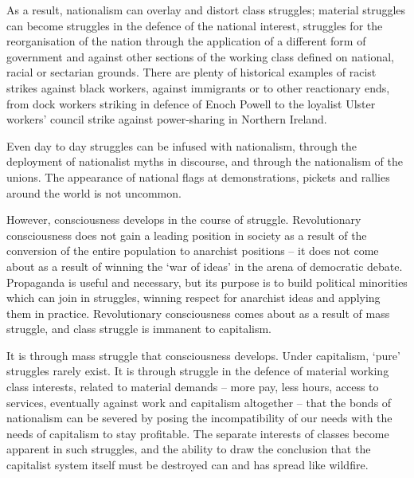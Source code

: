 As a result, nationalism can overlay and distort class struggles; material struggles can become struggles in the defence of the national interest, struggles for the reorganisation of the nation through the application of a different form of government and against other sections of the working class defined on national, racial or sectarian grounds.
There are plenty of historical examples of racist strikes against black workers, against immigrants or to other reactionary ends, from dock workers striking in defence of Enoch Powell to the loyalist Ulster workers’ council strike against power-sharing in Northern Ireland.

Even day to day struggles can be infused with nationalism, through the deployment of nationalist myths in discourse, and through the nationalism of the unions.
The appearance of national flags at demonstrations, pickets and rallies around the world is not uncommon.

However, consciousness develops in the course of struggle.
Revolutionary consciousness does not gain a leading position in society as a result of the conversion of the entire population to anarchist positions – it does not come about as a result of winning the ‘war of ideas’ in the arena of democratic debate.
Propaganda is useful and necessary, but its purpose is to build political minorities which can join in struggles, winning respect for anarchist ideas and applying them in practice.
Revolutionary consciousness comes about as a result of mass struggle, and class struggle is immanent to capitalism.

It is through mass struggle that consciousness develops.
Under capitalism, ‘pure’ struggles rarely exist.
It is through struggle in the defence of material working class interests, related to material demands – more pay, less hours, access to services, eventually against work and capitalism altogether – that the bonds of nationalism can be severed by posing the incompatibility of our needs with the needs of capitalism to stay profitable.
The separate interests of classes become apparent in such struggles, and the ability to draw the conclusion that the capitalist system itself must be destroyed can and has spread like wildfire.

